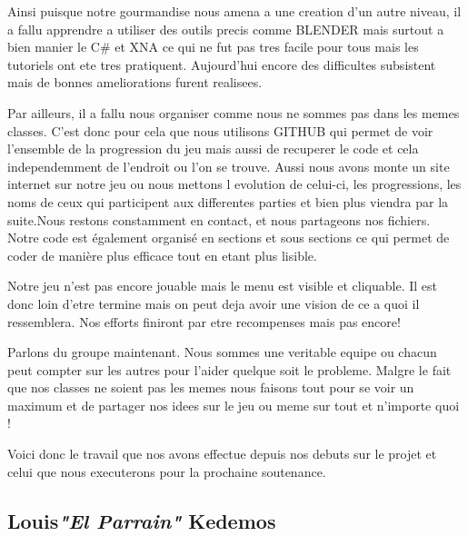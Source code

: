 \documentclass{article}
\begin{document}
\par
Ainsi puisque notre gourmandise nous amena a une creation d'un autre niveau, il a fallu apprendre a utiliser des outils precis comme BLENDER mais surtout a bien manier le C\# et XNA ce qui ne fut pas tres facile pour tous mais les tutoriels ont ete tres pratiquent. Aujourd'hui encore des difficultes subsistent mais de bonnes ameliorations furent realisees.
\newline

\par
Par ailleurs, il a fallu nous organiser comme nous ne sommes pas dans les memes classes. C'est donc pour cela que nous utilisons GITHUB qui permet de voir l'ensemble de la progression du jeu mais aussi de recuperer le code et cela independemment de l'endroit ou l'on se trouve. Aussi nous avons monte un site internet sur notre jeu ou nous mettons l evolution de celui-ci, les progressions, les noms de ceux qui participent aux differentes parties et bien plus viendra par la suite.Nous restons constamment en contact, et nous partageons nos fichiers. Notre code est également organisé en sections et sous sections ce qui permet de coder de manière plus efficace tout en etant  plus lisible.
\newline

\par
Notre jeu n'est pas encore jouable mais le menu est visible et cliquable. Il est donc loin d'etre termine mais on peut deja avoir une vision de ce a quoi il ressemblera. Nos efforts finiront par etre recompenses mais pas encore!
\newline

\par
Parlons du groupe maintenant. Nous sommes une veritable equipe ou chacun peut compter sur les autres pour l'aider quelque soit le probleme. Malgre le fait que nos classes ne soient pas les memes nous faisons tout pour se voir un maximum et de partager nos idees sur le jeu ou meme sur tout et n'importe quoi !
\newline

\par
Voici donc le travail que nos avons effectue depuis nos debuts sur le projet et celui que nous executerons pour la prochaine soutenance.

\newpage


\subsection{Louis\textcolor{pseudoblue}{\textit{"El Parrain"}} Kedemos }
\end{document}
